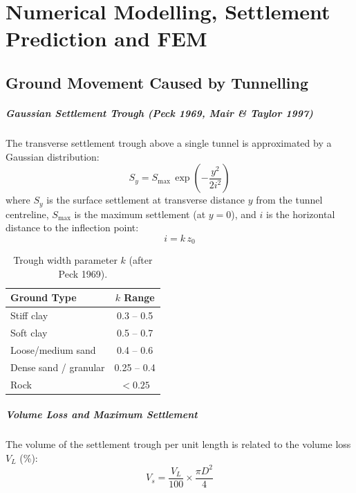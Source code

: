 \chapter{Numerical Modelling, Settlement Prediction and FEM}
\label{ch:numerical-modelling}

\section{Ground Movement Caused by Tunnelling}

\paragraph{Gaussian Settlement Trough (Peck 1969, Mair \& Taylor 1997)}
The transverse settlement trough above a single tunnel is approximated by a Gaussian distribution:
\[
S_y = S_{\text{max}} \, \exp\left(-\frac{y^2}{2i^2}\right)
\]
where $S_y$ is the surface settlement at transverse distance $y$ from the tunnel centreline, $S_{\text{max}}$ is the maximum settlement (at $y=0$), and $i$ is the horizontal distance to the inflection point:
\[
i = k \, z_0
\]

\begin{table}[h!]
\centering
\begin{tabular}{lc}
\toprule
\textbf{Ground Type} & \textbf{$k$ Range} \\
\midrule
Stiff clay & 0.3 -- 0.5 \\
Soft clay & 0.5 -- 0.7 \\
Loose/medium sand & 0.4 -- 0.6 \\
Dense sand / granular & 0.25 -- 0.4 \\
Rock & $<0.25$ \\
\bottomrule
\end{tabular}
\caption{Trough width parameter $k$ (after Peck 1969).}
\label{tab:k_values}
\end{table}

\paragraph{Volume Loss and Maximum Settlement}
The volume of the settlement trough per unit length is related to the volume loss $V_L$ (\%):
\[
V_s = \frac{V_L}{100} \times \frac{\pi D^2}{4}
\]

